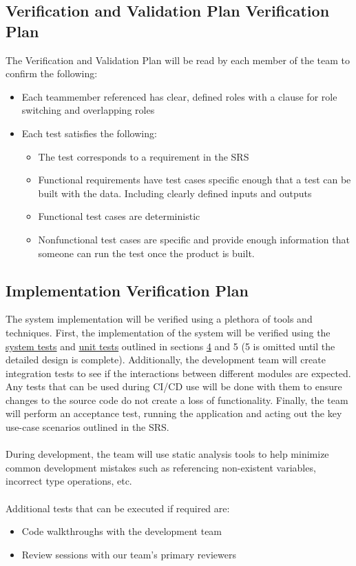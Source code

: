 \documentclass[12pt, titlepage]{article}
\begin{document}
\subsection{Verification and Validation Plan Verification Plan}
The Verification and Validation Plan will be read by each member of the team to confirm the following:
\begin{itemize}
\item Each teammember referenced has clear, defined roles with a clause for role switching and overlapping roles
\item Each test satisfies the following:
\begin{itemize}
\item The test corresponds to a requirement in the SRS
\item Functional requirements have test cases specific enough that a test can be built with the data. Including clearly defined inputs and outputs
\item Functional test cases are deterministic
\item Nonfunctional test cases are specific and provide enough information that someone can run the test once the product is built. 
\end{itemize}

\end{itemize}




\subsection{Implementation Verification Plan}
The system implementation will be verified using a plethora of tools and techniques. First, the implementation of the system will be verified using the \hyperref[section:systemTests]{system tests} and \hyperref[section:unitTests]{unit tests} outlined in sections \hyperref[section:systemTests]{4} and 5 (5 is omitted until the detailed design is complete). Additionally, the development team will create integration tests to see if the interactions between different modules are expected. Any tests that can be used during CI/CD use will be done with them to ensure changes to the source code do not create a loss of functionality. Finally, the team will perform an acceptance test, running the application and acting out the key use-case scenarios outlined in the SRS.\\
\\
During development, the team will use static analysis tools to help minimize common development mistakes such as referencing non-existent variables, incorrect type operations, etc.\\
\\ Additional tests that can be executed if required are:
\begin{itemize}
\item Code walkthroughs with the development team
\item Review sessions with our team's primary reviewers
\end{itemize}
\end{document}
